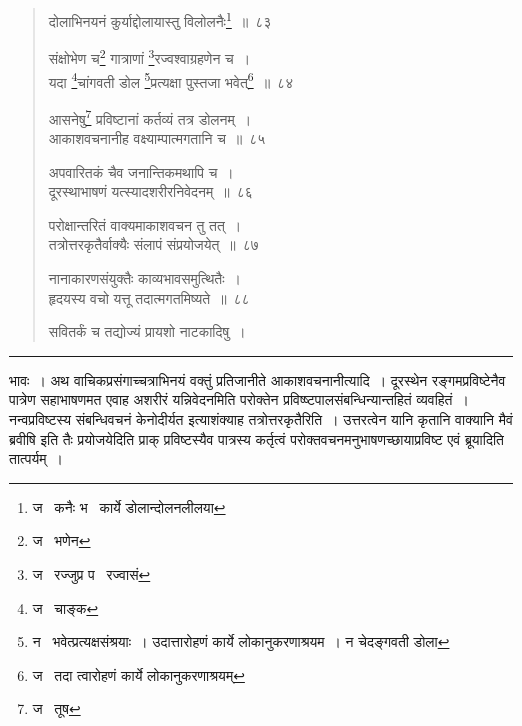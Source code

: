 \documentclass[11pt, openany]{book}
\begin{document}
\begin{quote}
{\na दोलाभिनयनं कुर्याद्दोलायास्तु विलोलनैः\renewcommand{\thefootnote}{1}\footnote{ज \textendash\  कनैः भ \textendash\  कार्ये डोलान्दोलनलीलया}~॥~८३

संक्षोभेण च\renewcommand{\thefootnote}{2}\footnote{ज \textendash\  भणेन} गात्राणां \renewcommand{\thefootnote}{3}\footnote{ज \textendash\  रज्जुप्र प \textendash\  रज्वासं}रज्वश्वाग्रहणेन च~।\\
यदा \renewcommand{\thefootnote}{4}\footnote{ज \textendash\  चाङ्क}चांगवती डोल \renewcommand{\thefootnote}{5}\footnote{न \textendash\  भवेत्प्रत्यक्षसंश्रयाः~। उदात्तारोहणं कार्ये लोकानुकरणाश्रयम~। न चेदङ्गवती डोला}प्रत्यक्षा पुस्तजा भवेत्\renewcommand{\thefootnote}{6}\footnote{ज \textendash\  तदा त्वारोहणं कार्ये लोकानुकरणाश्रयम्}~॥~८४

आसनेषु\renewcommand{\thefootnote}{7}\footnote{ज \textendash\  तूष} प्रविष्टानां कर्तव्यं तत्र डोलनम्~।\\
आकाशवचनानीह वक्ष्याम्पात्मगतानि च~॥~८५

अपवारितकं चैव जनान्तिकमथापि च~।\\
दूरस्थाभाषणं यत्स्यादशरीरनिवेदनम्~॥~८६

परोक्षान्तरितं वाक्यमाकाशवचन तु तत्~।\\
तत्रोत्तरकृतैर्वाक्यैः संलापं संप्रयोजयेत्~॥~८७

नानाकारणसंयुक्तैः काव्यभावसमुत्थितैः~।\\
हृदयस्य वचो यत्तू तदात्मगतमिष्यते~॥~८८

सवितर्कं च तद्योज्यं प्रायशो नाटकादिषु~।}
\end{quote}

\hrule

\vspace{2mm}
\noindent
भावः~। अथ वाचिकप्रसंगाच्चत्राभिनयं वक्तुं प्रतिजानीते आकाशवचनानीत्यादि~। दूरस्थेन रङ्गमप्रविष्टेनैव पात्रेण सहाभाषणमत एवाह अशरीरं यन्निवेदनमिति परोक्तेन प्रविष्ष्टपालसंबन्धिन्यान्तहितं व्यवहितं~। नन्वप्रविष्टस्य संबन्धिवचनं केनोदीर्यत इत्याशंक्याह तत्रोत्तरकृतैरिति~। उत्तरत्वेन यानि कृतानि वाक्यानि {\qt मैवं ब्रवीषि} इति तैः प्रयोजयेदिति प्राक् प्रविष्टस्यैव पात्रस्य कर्तृत्वं परोक्तवचनमनुभाषणच्छायाप्रविष्ट एवं ब्रूयादिति तात्पर्यम्~।

\newpage
\end{document}
